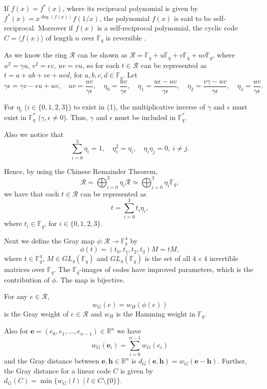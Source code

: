 \documentclass[12pt]{article}
\begin{document}
If $f(x) = f^*(x)$, where its reciprocal polynomial is given by $f^*(x) = x^{\deg(f(x))} f(1/x)$, the polynomial $f(x)$ is said to be self-reciprocal. Moreover if $f(x)$ is a self-reciprocal polynomial, the cyclic code $C = \langle f(x) \rangle$ of length $n$ over $\mathbb{F}_q$ is reversible \cite{15}.

As we know the ring $\mathcal{R}$ can be shown as $\mathcal{R} = \mathbb{F}_q + u\mathbb{F}_q + v\mathbb{F}_q + uv\mathbb{F}_q$, where $u^2 = \gamma u$, $v^2 = \epsilon v$, $uv = vu$, so for each $t \in \mathcal{R}$ can be represented as $t = a + ub + vc + uvd$, for $a, b, c, d \in \mathbb{F}_q$. Let
\[
\gamma \epsilon = \gamma v - \epsilon u + uv, \quad uv = \frac{uv}{\gamma \epsilon}, \quad \eta_0 = \frac{uv}{\gamma \epsilon}, \quad \eta_1 = \frac{u\epsilon - uv}{\gamma \epsilon}, \quad \eta_2 = \frac{v\gamma - uv}{\gamma \epsilon}, \quad \eta_3 = \frac{uv}{\gamma \epsilon}.
\]

For $\eta_i$ ($i \in \{0, 1, 2, 3\}$) to exist in (1), the multiplicative inverse of $\gamma$ and $\epsilon$ must exist in $\mathbb{F}_q^*$ ($\gamma, \epsilon \neq 0$). Thus, $\gamma$ and $\epsilon$ must be included in $\mathbb{F}_q^*$.

Also we notice that
\[
\sum_{i=0}^3 \eta_i = 1, \quad \eta_i^2 = \eta_i, \quad \eta_i \eta_j = 0, \ i \neq j.
\]

Hence, by using the Chinese Remainder Theorem,
\[
\mathcal{R} = \bigoplus_{i=0}^3 \eta_i \mathcal{R} \simeq \bigoplus_{i=0}^3 \eta_i \mathbb{F}_q,
\]
we have that each $t \in \mathcal{R}$ can be represented as
\[
t = \sum_{i=0}^3 t_i \eta_i,
\]
where $t_i \in \mathbb{F}_q$, for $i \in \{0, 1, 2, 3\}$.

Next we define the Gray map $\phi : \mathcal{R} \longrightarrow \mathbb{F}_q^4$ by
\[
\phi(t) = (t_0, t_1, t_2, t_3)M = tM,
\]
where $t \in \mathbb{F}_q^4$, $M \in GL_4(\mathbb{F}_q)$ and $GL_4(\mathbb{F}_q)$ is the set of all $4 \times 4$ invertible matrices over $\mathbb{F}_q$. The $\mathbb{F}_q$-images of codes have improved parameters, which is the contribution of $\phi$. The map is bijective.

For any $e \in \mathcal{R}$,
\[
w_G(e) = w_H(\phi(e))
\]
is the Gray weight of $e \in \mathcal{R}$ and $w_H$ is the Hamming weight in $\mathbb{F}_q$.

Also for $\mathbf{e} = (e_0, e_1, \ldots, e_{n-1}) \in \mathbb{R}^n$ we have
\begin{equation}
w_G(\mathbf{e}_i) = \sum_{i=0}^{n-1} w_G(e_i)
\end{equation}
and the Gray distance between $\mathbf{e}, \mathbf{h} \in \mathbb{R}^n$ is $d_G(\mathbf{e}, \mathbf{h}) = w_G(\mathbf{e} - \mathbf{h})$. Further, the Gray distance for a linear code $C$ is given by $d_G(C) = \min\{ w_G(l) \mid l \in C \setminus \{0\} \}$.
\end{document}

